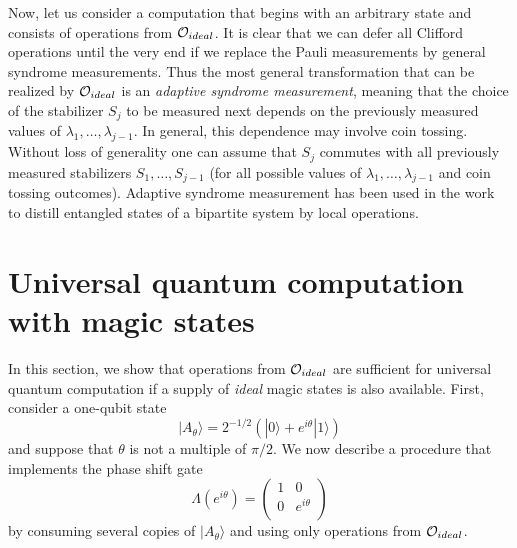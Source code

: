 \documentclass[pra,twocolumn,showpacs]{revtex4}
\newcommand{\calO}{{\cal O }}
\newcommand{\ra}{\rangle}
\newcommand{\ba}{\begin{array}}
\newcommand{\ea}{\end{array}}
\begin{document}
Now, let us consider a computation that begins with an arbitrary state and
consists of operations from $\calO_{ideal}$. It is clear that we can defer all
Clifford operations until the very end if we replace the Pauli measurements by
general syndrome measurements. Thus the most general transformation that can
be realized by $\calO_{ideal}$ is an {\it adaptive syndrome measurement},
meaning that the choice of the stabilizer $S_j$ to be measured next depends on
the previously measured values of $\lambda_1,\ldots,\lambda_{j-1}$. In
general, this dependence may involve coin tossing. Without loss of generality
one can assume that $S_j$ commutes with all previously measured stabilizers
$S_1,\ldots,S_{j-1}$ (for all possible values of
$\lambda_1,\ldots,\lambda_{j-1}$ and coin tossing outcomes).  Adaptive
syndrome measurement has been used in the work~\cite{AG03} to distill
entangled states of a bipartite system by local operations.


\section{\label{sec:UQC} Universal quantum computation with magic states}

In this section, we show that operations from $\calO_{ideal}$ are sufficient
for universal quantum computation if a supply of {\it ideal } magic states is also
available. First, consider a one-qubit state
\begin{equation}
\label{theta}
|A_\theta\ra=2^{-1/2} (|0\ra + e^{i\theta} |1\ra)
\end{equation}
and suppose that $\theta$ is not a multiple of $\pi/2$.
We now describe a procedure that implements the phase shift gate
\[
\Lambda(e^{i\theta}) = \left( \ba{cc} 1 & 0 \\ 0 & e^{i\theta} \\ \ea \right)
\]
by consuming several copies of $|A_\theta\ra$ and using only operations from
$\calO_{ideal}$.
\end{document}
